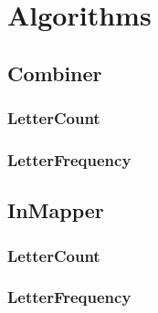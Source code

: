 \chapter{Algorithms}


\section{Combiner}
\subsection{LetterCount}
\subsection{LetterFrequency}

\section{InMapper}
\subsection{LetterCount}
\subsection{LetterFrequency}